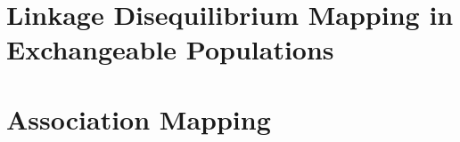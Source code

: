 







\part{Linkage Disequilibrium Mapping in Exchangeable Populations}
\label{part:exchangeable}







\part{Association Mapping}
\label{part:nonexchangeable}

% 








